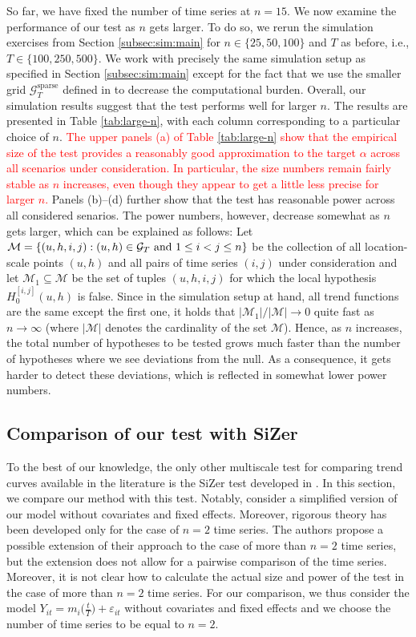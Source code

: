 \documentclass[12pt]{article}
\makeatletter
\renewcommand{\eqref}[1]{\tagform@{\ref{#1}}}
\makeatother
\begin{document}
So far, we have fixed the number of time series at $n = 15$. We now examine the performance of our test as $n$ gets larger. To do so, we rerun the simulation exercises from Section \ref{subsec:sim:main} for $n \in \{25,50,100\}$ and $T$ as before, i.e., $T \in \{100,250,500\}$. We work with precisely the same simulation setup as specified in Section \ref{subsec:sim:main} except for the fact that we use the smaller grid $\mathcal{G}_T^{\text{sparse}}$ defined in \eqref{eq:grid-sparse} to decrease the computational burden. Overall, our simulation results suggest that the test performs well for larger $n$. The results are presented in Table \ref{tab:large-n}, with each column corresponding to a particular choice of $n$. \textcolor{red}{The upper panels (a) of Table \ref{tab:large-n} show that the empirical size of the test provides a reasonably good approximation to the target $\alpha$ across all scenarios under consideration. In particular, the size numbers remain fairly stable as $n$ increases, even though they appear to get a little less precise for larger $n$.} Panels (b)--(d) further show that the test has reasonable power across all considered senarios. The power numbers, however, decrease somewhat as $n$ gets larger, which can be explained as follows: Let $\mathcal{M} = \{ (u,h,i,j): (u,h) \in \mathcal{G}_T \text{ and } 1 \le i < j \le n \}$ be the collection of all location-scale points $(u,h)$ and all pairs of time series $(i,j)$ under consideration and let $\mathcal{M}_1 \subseteq \mathcal{M}$ be the set of tuples $(u,h,i,j)$ for which the local hypothesis $H_0^{[i, j]}(u, h)$ is false. Since in the simulation setup at hand, all trend functions are the same except the first one, it holds that $|\mathcal{M}_1| / |\mathcal{M}| \to 0$ quite fast as $n \to \infty$ (where $| \mathcal{M} |$ denotes the cardinality of the set $\mathcal{M}$). Hence, as $n$ increases, the total number of hypotheses to be tested grows much faster than the number of hypotheses where we see deviations from the null. As a consequence, it gets harder to detect these deviations, which is reflected in somewhat lower power numbers. 


\subsection{Comparison of our test with SiZer} 


To the best of our knowledge, the only other multiscale test for comparing trend curves available in the literature is the SiZer test developed in \cite{Park2009}. In this section, we compare our method with this test. Notably, \cite{Park2009} consider a simplified version of our model without covariates and fixed effects. Moreover, rigorous theory has been developed only for the case of $n=2$ time series. The authors propose a possible extension of their approach to the case of more than $n=2$ time series, but the extension does not allow for a pairwise comparison of the time series. Moreover, it is not clear how to calculate the actual size and power of the test in the case of more than $n=2$ time series. For our comparison, we thus consider the model $Y_{it} = m_i\big(\frac{t}{T}\big) + \varepsilon_{it}$ without covariates and fixed effects and we choose the number of time series to be equal to $n=2$. 
\end{document}
